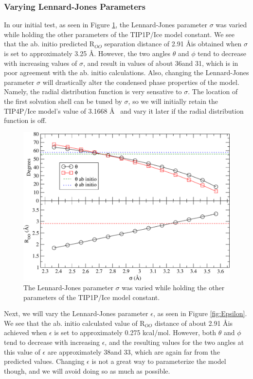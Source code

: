 \subsubsection{Varying Lennard-Jones Parameters}
In our initial test, as seen in Figure \ref{fig:Sigma}, the Lennard-Jones 
parameter $\sigma$ was varied 
while holding the other parameters of the TIP1P/Ice model constant. We see that
the ab. initio predicted R$_{OO}$ separation distance of 2.91 \AA is obtained
when $\sigma$ is set to approximately 3.25 \AA . However, the two angles 
$\theta$ and $\phi$ tend to decrease with increasing values of $\sigma$, 
and result in values of about 36\degree and 31\degree, which is in poor 
agreement with the ab. initio calculations. Also, changing the Lennard-Jones
parameter $\sigma$ will drastically alter the condensed phase properties
of the model. Namely, the radial distribution function is very sensative to
$\sigma$. The location of the first solvation shell can be tuned by $\sigma$,
so we will initially retain the TIP4P/Ice model's value of 3.1668 \AA~ and vary
it later if the radial distribution function is off.


\begin{figure}[h!]
\includegraphics[width = \linewidth]{Figures/Test1_plot.pdf}
\caption{\label{fig:Sigma} The Lennard-Jones parameter $\sigma$ was varied while holding the other parameters of the TIP1P/Ice model constant.}
\end{figure}


Next, we will vary the Lennard-Jones parameter $\epsilon$, as seen in 
Figure \ref{fig:Epsilon}. We see that the ab. initio calculated value 
of R$_{OO}$ 
distance of about 2.91 \AA is achieved when $\epsilon$ is set to 
approximately 0.275 kcal/mol. However, both $\theta$ and $\phi$ tend to 
decrease with increasing $\epsilon$, and the resulting values for the two 
angles at this value of $\epsilon$ are approximately 38\degree and 33\degree,
which are again far from the predicted values. Changing $\epsilon$ is not a
great way to parameterize the model though, and we will avoid doing so as much
as possible.

